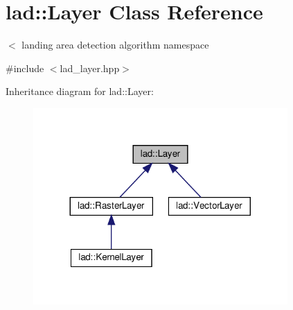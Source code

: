 \hypertarget{classlad_1_1_layer}{}\section{lad\+:\+:Layer Class Reference}
\label{classlad_1_1_layer}


$<$ landing area detection algorithm namespace  




{\ttfamily \#include $<$lad\+\_\+layer.\+hpp$>$}



Inheritance diagram for lad\+:\+:Layer\+:\nopagebreak
\begin{figure}[H]
\begin{center}
\leavevmode
\includegraphics[width=275pt]{classlad_1_1_layer__inherit__graph}
\end{center}
\end{figure}

